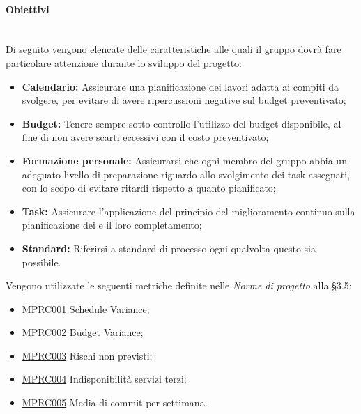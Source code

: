 \paragraph{Obiettivi}\mbox{}\\[0.4cm]
Di seguito vengono elencate delle caratteristiche alle quali il gruppo dovrà fare particolare attenzione durante lo sviluppo del progetto:
\begin{itemize}
	\item \textbf{Calendario:} Assicurare una pianificazione dei lavori adatta ai compiti da svolgere, per evitare di avere ripercussioni negative sul budget preventivato;
	\item \textbf{Budget:} Tenere sempre sotto controllo l'utilizzo del budget disponibile, al fine di non avere scarti eccessivi con il costo preventivato;
	\item \textbf{Formazione personale:} Assicurarsi che ogni membro del gruppo abbia un adeguato livello di preparazione riguardo allo svolgimento dei task assegnati, con lo scopo di evitare ritardi rispetto a quanto pianificato;
	\item \textbf{Task:} Assicurare l'applicazione del principio del miglioramento continuo sulla pianificazione dei  e il loro completamento;
	\item \textbf{Standard:} Riferirsi a standard di processo ogni qualvolta questo sia possibile.
\end{itemize}
Vengono utilizzate le seguenti metriche definite nelle \textit{Norme di progetto} alla §3.5:
\begin{itemize}
	\item \label{metrica_processo_MPRC001}\hyperref[sec:qprocesso_tabella_metriche_obiettivi]{MPRC001} Schedule Variance;
	\item \label{metrica_processo_MPRC002}\hyperref[sec:qprocesso_tabella_metriche_obiettivi]{MPRC002} Budget Variance;
	\item \label{metrica_processo_MPRC003}\hyperref[sec:qprocesso_tabella_metriche_obiettivi]{MPRC003} Rischi non previsti;
	\item \label{metrica_processo_MPRC004}\hyperref[sec:qprocesso_tabella_metriche_obiettivi]{MPRC004} Indisponibilità servizi terzi;
	\item \label{metrica_processo_MPRC005}\hyperref[sec:qprocesso_tabella_metriche_obiettivi]{MPRC005} Media di commit per settimana.
\end{itemize}
